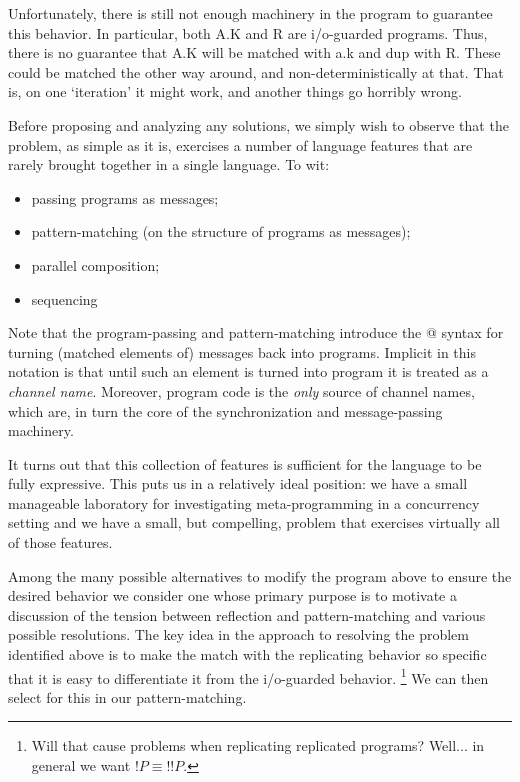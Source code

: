 Unfortunately, there is still not enough machinery in the program to
guarantee this behavior. In particular, both \textsf{A.K} and R are
i/o-guarded programs. Thus, there is no guarantee that \textsf{A.K}
will be matched with \textsf{a.k} and \textsf{dup} with R. These could
be matched the other way around, and non-deterministically at
that. That is, on one `iteration' it might work, and another things go
horribly wrong.

Before proposing and analyzing any solutions, we simply wish to
observe that the problem, as simple as it is, exercises a number of
language features that are rarely brought together in a single
language. To wit:

\begin{itemize}
  \item passing programs as messages;
  \item pattern-matching (on the structure of programs as messages);
  \item parallel composition;
  \item sequencing
\end{itemize}

Note that the program-passing and pattern-matching introduce the
\textsf{@} syntax for turning (matched elements of) messages back into
programs. Implicit in this notation is that until such an element is
turned into program it is treated as a \emph{channel name}. Moreover,
program code is the \emph{only} source of channel names, which are, in
turn the core of the synchronization and message-passing machinery.

It turns out that this collection of features is sufficient for the
language to be fully expressive. This puts us in a relatively ideal
position: we have a small manageable laboratory for investigating
meta-programming in a concurrency setting and we have a small, but
compelling, problem that exercises virtually all of those features.

Among the many possible alternatives to modify the program above to
ensure the desired behavior we consider one whose primary purpose is
to motivate a discussion of the tension between reflection and
pattern-matching and various possible resolutions. The key idea in the
approach to resolving the problem identified above is to make the
match with the replicating behavior so specific that it is easy to
differentiate it from the i/o-guarded behavior. \footnote{Will that
  cause problems when replicating replicated programs? Well... in
  general we want $!P \equiv !!P$.} We can then select for this in
our pattern-matching. 


